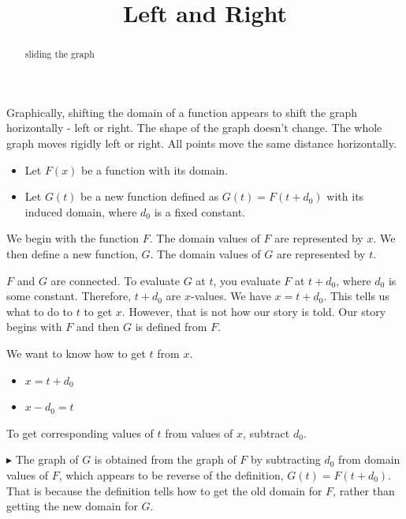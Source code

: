 \documentclass{ximera}
\title{Left and Right}
\begin{document}
\begin{abstract}
sliding the graph
\end{abstract}
\maketitle













Graphically, shifting the domain of a function appears to shift the graph horizontally - left or right.  The shape of the graph doesn't change.  The whole graph moves rigidly left or right.  All points move the same distance horizontally. 


\begin{itemize}
\item Let $F(x)$ be a function with its domain.

\item Let $G(t)$ be a new function defined as $G(t) = F(t+d_0)$ with its induced domain, where $d_0$ is a fixed constant.
\end{itemize}



We begin with the function $F$.  The domain values of $F$ are represented by $x$.  We then define a new function, $G$. The domain values of $G$ are represented by $t$. 

$F$ and $G$ are connected.  To evaluate $G$ at $t$, you evaluate $F$ at $t + d_0$, where $d_0$ is some constant.  Therefore, $t + d_0$ are $x$-values. We have $x = t + d_0$.  This tells us what to do to $t$ to get $x$.  However, that is not how our story is told.  Our story begins with $F$ and then $G$ is defined from $F$.  

We want to know how to get $t$ from $x$.  


\begin{itemize}
\item $x = t + d_0$

\item $x - d_0 = t$
\end{itemize}


To get corresponding values of $t$ from values of $x$, subtract $d_0$.   



$\blacktriangleright$  The graph of $G$ is obtained from the graph of $F$ by subtracting $d_0$ from domain values of $F$, which appears to be reverse of the definition, $G(t) = F(t+d_0)$.  That is because the definition tells how to get the old domain for $F$, rather than getting the new domain for $G$.
\end{document}

